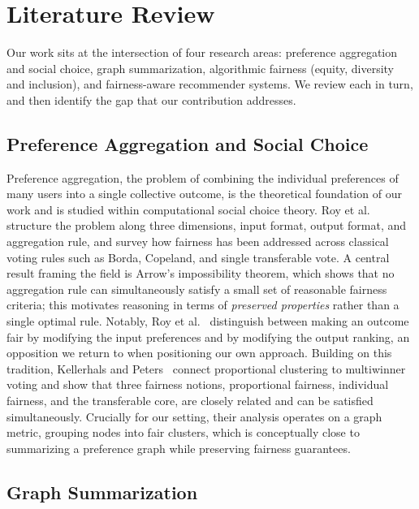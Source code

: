 \documentclass[runningheads]{llncs}
\begin{document}
\section{Literature Review}\label{sec:litreview} Our work sits at the intersection of four research areas: preference
aggregation and social choice, graph summarization, algorithmic fairness
(equity, diversity and inclusion), and fairness-aware recommender systems.
We review each in turn, and then identify the gap that our contribution
addresses.

\subsection{Preference Aggregation and Social Choice}

Preference aggregation, the problem of combining the individual preferences
of many users into a single collective outcome, is the theoretical foundation
of our work and is studied within computational social choice theory. Roy et
al.~\cite{roy_fairness_2024} structure the problem along three dimensions,
input format, output format, and aggregation rule, and survey how fairness
has been addressed across classical voting rules such as Borda, Copeland, and
single transferable vote. A central result framing the field is Arrow's
impossibility theorem, which shows that no aggregation rule can simultaneously
satisfy a small set of reasonable fairness criteria; this motivates reasoning
in terms of \emph{preserved properties} rather than a single optimal rule.
Notably, Roy et al.~\cite{roy_fairness_2024} distinguish between making an
outcome fair by modifying the input preferences and by modifying the output
ranking, an opposition we return to when positioning our own approach.
Building on this tradition, Kellerhals and Peters~\cite{kellerhals_proportional_2024}
connect proportional clustering to multiwinner voting and show that three fairness notions, proportional fairness, individual fairness, and the transferable core, are closely related and can be satisfied simultaneously. Crucially for our setting, their analysis operates on a graph metric, grouping nodes into fair clusters, which is conceptually close to summarizing a preference graph while preserving fairness guarantees.

\subsection{Graph Summarization}
\end{document}
